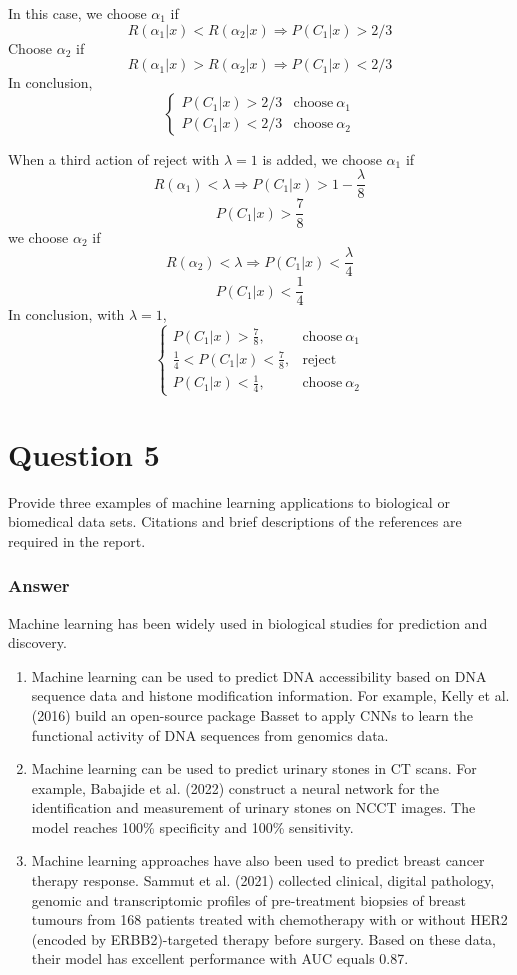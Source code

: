 \documentclass{article}
\begin{document}
\noindent In this case, we choose $\alpha_1$ if $$R(\alpha_1|x) < R(\alpha_2|x) \Rightarrow P(C_1|x)>2/3$$
Choose $\alpha_2$ if $$R(\alpha_1|x) > R(\alpha_2|x) \Rightarrow P(C_1|x)<2/3$$
In conclusion,
$$
\begin{cases}
    P(C_1|x)>2/3& \text{choose}\:\alpha_1\\
    P(C_1|x)<2/3& \text{choose}\:\alpha_2
\end{cases}
$$

\noindent When a third action of reject with $\lambda = 1$ is added, we choose $\alpha_1$ if 
$$R(\alpha_1) < \lambda \Rightarrow P(C_1|x)>1-\frac{\lambda}{8}$$
$$P(C_1|x)>\frac{7}{8}$$
we choose $\alpha_2$ if $$R(\alpha_2) < \lambda \Rightarrow P(C_1|x)<\frac{\lambda}{4}$$
$$P(C_1|x)<\frac{1}{4}$$
In conclusion, with $\lambda=1$, 
$$
\begin{cases}
    P(C_1|x)>\frac{7}{8},& \text{choose}\:\alpha_1\\
    \frac{1}{4} < P(C_1|x) < \frac{7}{8},& \text{reject}\\
    P(C_1|x)<\frac{1}{4},& \text{choose}\:\alpha_2
\end{cases}
$$

\section*{Question 5}
Provide three examples of machine learning applications to biological or biomedical data sets. Citations and brief descriptions of the references are required in the report. 

\subsubsection*{Answer}
Machine learning has been widely used in biological studies for prediction and discovery.

\begin{enumerate}
    \item Machine learning can be used to predict DNA accessibility based on DNA sequence data and histone modification information. For example, Kelly et al. (2016) build an open-source package Basset to apply CNNs to learn the functional activity of DNA sequences from genomics data. 
    \item Machine learning can be used to predict urinary stones in CT scans. For example, Babajide et al. (2022) construct a neural network for the identification and measurement of urinary stones on NCCT images. The model reaches 100\% specificity and 100\% sensitivity.
    \item Machine learning approaches have also been used to predict breast cancer therapy response. Sammut et al. (2021) collected clinical, digital pathology, genomic and transcriptomic profiles of pre-treatment biopsies of breast tumours from 168 patients treated with chemotherapy with or without HER2 (encoded by ERBB2)-targeted therapy before surgery. Based on these data, their model has excellent performance with AUC equals 0.87.
\end{enumerate}
\end{document}
